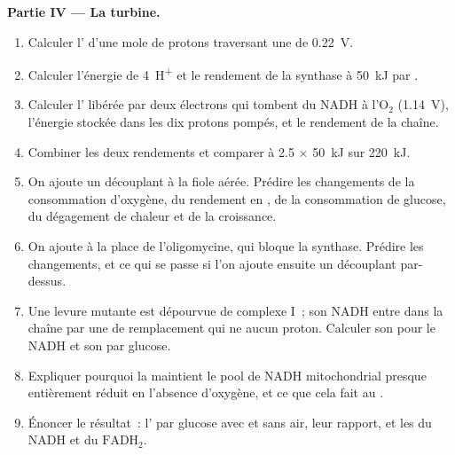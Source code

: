 \begin{problem}
\medskip
\noindent\textbf{Partie IV --- La turbine.}
\begin{enumerate}[resume]
  \item Calculer l' d'une mole de protons traversant une
         de \qty{0.22}{V}.
  \item Calculer l'énergie de \qty{4}{H^+} et le rendement de la
        synthase à \qty{50}{kJ} par .
  \item Calculer l' libérée par deux électrons qui tombent
        du NADH à l'$\mathrm{O_2}$ (\qty{1.14}{V}), l'énergie stockée
        dans les dix protons pompés, et le rendement de la chaîne.
  \item Combiner les deux rendements et comparer à 2.5  $\times$
        \qty{50}{kJ} sur \qty{220}{kJ}.
  \item On ajoute un découplant à la fiole aérée. Prédire les
        changements de la consommation d'oxygène, du rendement en ,
        de la consommation de glucose, du dégagement de chaleur et de la
        croissance.
  \item On ajoute à la place de l'oligomycine, qui bloque la synthase.
        Prédire les changements, et ce qui se passe si l'on ajoute
        ensuite un découplant par-dessus.
  \item Une levure mutante est dépourvue de complexe I~; son NADH entre
        dans la chaîne par une  de remplacement qui ne  aucun
        proton. Calculer son  pour le NADH et son  par
        glucose.
  \item Expliquer pourquoi la  maintient le pool de NADH
        mitochondrial presque entièrement réduit en l'absence d'oxygène,
        et ce que cela fait au .
  \item Énoncer le résultat~: l' par glucose avec et sans air, leur
        rapport, et les  du NADH et du $\mathrm{FADH_2}$.
\end{enumerate}
\end{problem}
